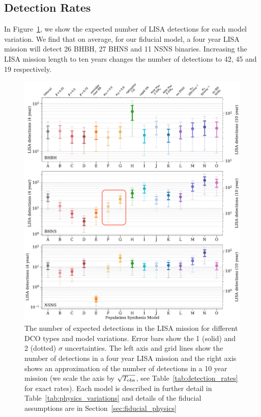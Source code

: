 \documentclass[twocolumn]{aastex63}
\begin{document}
\subsection{Detection Rates}
In Figure~\ref{fig:detection_rates}, we show the expected number of LISA detections for each model variation. We find that on average, for our fiducial model, a four year LISA mission will detect 26 BHBH, 27 BHNS and 11 NSNS binaries. Increasing the LISA mission length to ten years changes the number of detections to 42, 45 and 19 respectively.

\begin{figure}[p]
    \centering
    \includegraphics[width=\textwidth]{dco_detections.pdf}
    \caption{The number of expected detections in the LISA mission for different DCO types and model variations. Error bars show the 1 (solid) and 2 (dotted) $\sigma$ uncertainties. The left axis and grid lines show the number of detections in a four year LISA mission and the right axis shows an approximation of the number of detections in a 10 year mission (we scale the axis by $\sqrt{T_{\rm obs}}$, see Table~\ref{tab:detection_rates} for exact rates). Each model is described in further detail in Table~\ref{tab:physics_variations} and details of the fiducial assumptions are in  Section~\ref{sec:fiducial_physics}}
    \label{fig:detection_rates}
\end{figure}
\end{document}

